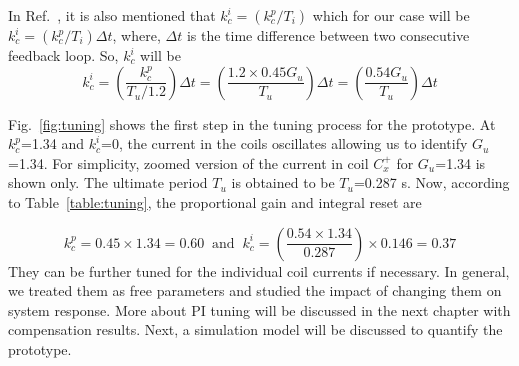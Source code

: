 In Ref.~\cite{tuning_formula}, it is also mentioned that $k_c^i=(k_c^p/T_i)$ which for our case will be $k_c^i=(k_c^p/T_i)\Delta t$, where, $\Delta t$ is the time difference between two consecutive feedback loop. So, $k_c^i$ will be
\begin{equation}
    k_c^i=\left(\frac{k_c^p}{T_u/1.2}\right)\Delta t=\left(\frac{1.2\times0.45 G_u}{T_u}\right)\Delta t=\left(\frac{0.54 G_u}{T_u}\right)\Delta t
\end{equation}

Fig.~\ref{fig:tuning} shows the first step in the tuning process for the prototype. At $k_c^p$=1.34 and $k_c^i$=0, the current in the coils oscillates allowing us to identify $G_u$=1.34. For simplicity, zoomed version of the current in coil $C_x^+$ for $G_u$=1.34 is shown only. The ultimate period $T_u$ is obtained to be $T_u$=0.287 s. Now, according to Table~\ref{table:tuning}, the proportional gain and integral reset are

\begin{equation}
    k_c^p=0.45\times1.34=0.60\;\;\text{and}\;\; k_c^i=\left(\frac{0.54 \times1.34}{0.287}\right)\times0.146=0.37
\end{equation}
They can be further tuned for the individual coil currents if necessary. In general, we treated them as free parameters and studied the impact of changing them on system response. More about PI tuning will be discussed in the next chapter with compensation results. Next, a simulation model will be discussed to quantify the prototype.






